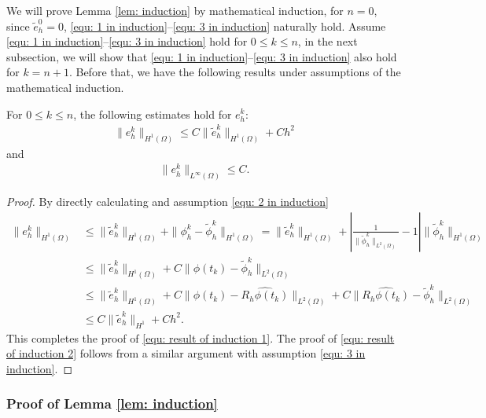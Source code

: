 \documentclass{siamart250211}
\begin{document}
We will prove Lemma \ref{lem: induction} by mathematical induction, for $n = 0$, since $\tilde{e}_h^0 = 0$, \eqref{equ: 1 in induction}--\eqref{equ: 3 in induction} naturally hold. Assume \eqref{equ: 1 in induction}--\eqref{equ: 3 in induction} hold for $0 \le k \le n$, in the next subsection,  we will show that \eqref{equ: 1 in induction}--\eqref{equ: 3 in induction} also hold for $k = n+1$. Before that, we have the following results under assumptions of the mathematical induction.
\begin{lemma}
	For $0 \le k \le n$, the following estimates hold for $e_h^k$:
	\begin{align}\label{equ: result of induction 1}
		\|e_h^k\|_{H^1(\Omega)} \le C \|\tilde{e}_h^{k}\|_{H^1(\Omega)} + Ch^2
	\end{align}
    and 
    \begin{align}\label{equ: result of induction 2}
		\|e_h^k\|_{L^{\infty}(\Omega)} \le C.
	\end{align}
\end{lemma}
\begin{proof}
	By directly calculating and assumption \eqref{equ: 2 in induction}
	\begin{align*}
		\|e_h^k\|_{H^1(\Omega)} &\le  \|\tilde{e}_h^{k}\|_{H^1(\Omega)} + \|\phi_h^k - \tilde{\phi}_h^k\|_{H^1(\Omega)} = \|\tilde{e}_h^{k}\|_{H^1(\Omega)} + \left|\frac{1}{\|\tilde{\phi}_h^k\|_{L^2(\Omega)} } -1\right|\|\tilde{\phi}_h^k\|_{H^1(\Omega)} \\
		& \le \|\tilde{e}_h^{k}\|_{H^1(\Omega)} + C \|\phi(t_k) - \tilde{\phi}_h^k\|_{L^2(\Omega)} \\
		& \le \|\tilde{e}_h^{k}\|_{H^1(\Omega)} + C \|\phi(t_k) - \widehat{R_h\phi(t_k)}\|_{L^2(\Omega)} + C \|\widehat{R_h\phi(t_k)} - \tilde{\phi}_h^k\|_{L^2(\Omega)}  \\
		& \le C \|\tilde{e}_h^{k}\|_{H^1} + Ch^2.
	\end{align*}
This completes the proof of \eqref{equ: result of induction 1}. The proof of \eqref{equ: result of induction 2} follows from a similar argument with assumption \eqref{equ: 3 in induction}.
\end{proof}

\subsubsection{Proof of Lemma \ref{lem: induction}}
\end{document}
